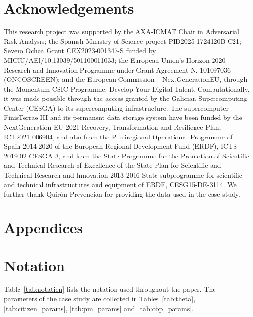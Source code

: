 \documentclass[12pt]{article}
\begin{document}
\section*{Acknowledgements}
This research project was supported by the AXA-ICMAT Chair in Adversarial Risk Analysis; the Spanish Ministry of Science project PID2025-1724120B-C21; Severo Ochoa Grant CEX2023-001347-S funded by MICIU/AEI/10.13039/501100011033; the European Union's Horizon 2020 Research and Innovation Programme under Grant Agreement N. 101097036 (ONCOSCREEN); and the European Commission – NextGenerationEU, through the Momentum CSIC Programme: Develop Your Digital Talent. Computationally, it was made possible through the access granted by the Galician Supercomputing Center (CESGA) to its supercomputing infrastructure. The supercomputer FinisTerrae III and its permanent data storage system have been funded by the NextGeneration EU 2021 Recovery, Transformation and Resilience Plan, ICT2021-006904, and also from the Pluriregional Operational Programme of Spain 2014-2020 of the European Regional Development Fund (ERDF), ICTS-2019-02-CESGA-3, and from the State Programme for the Promotion of Scientific and Technical Research of Excellence of the State Plan for Scientific and Technical Research and Innovation 2013-2016 State subprogramme for scientific and technical infrastructures and equipment of ERDF, CESG15-DE-3114. We further thank Quirón Prevención for providing the data used in the case study. 

\appendix

\section*{Appendices}
\section{Notation}\label{app:notation}

Table~\ref{tab:notation} lists the notation used throughout the paper. The parameters of the case study are collected in Tables~\ref{tab:theta}, \ref{tab:citizen_params}, \ref{tab:pm_params} and~\ref{tab:obp_params}.
\end{document}
